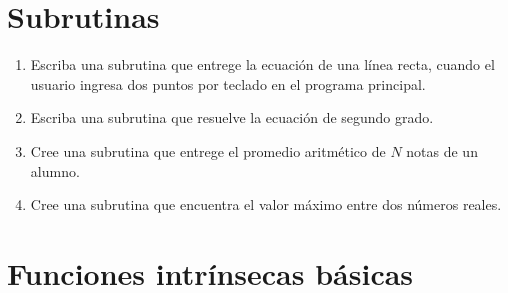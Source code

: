 \documentclass[11pt]{exam}
\begin{document}
\section{Subrutinas}
\begin{enumerate}
\item Escriba una subrutina que  entrege la ecuaci\'on de una l\'inea recta, cuando
el usuario ingresa dos puntos por teclado en el programa principal.
 \item Escriba una subrutina que resuelve la ecuaci\'on de segundo grado.
\item  Cree una subrutina que entrege el promedio aritm\'etico de $N$ notas de un alumno.
\item Cree una subrutina que encuentra el valor m\'aximo entre dos n\'umeros reales.
\end{enumerate}
%
\section{Funciones intr\'insecas b\'asicas}
\end{document}
